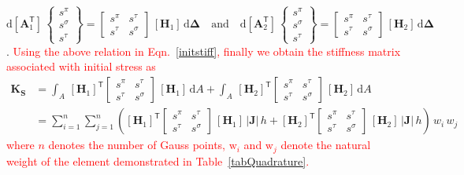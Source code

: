 \begin{equation}
\mathrm{d} [\mathbf{A}_1^{\mathsf{T}}] \, \begin{Bmatrix} s^{\pi} \\ s^{\sigma} \\  s^{\tau} \end{Bmatrix} = \begin{bmatrix}s^{\pi} & s^{\tau} \\ 
s^{\tau} & s^{\sigma} \end{bmatrix} \, [\mathbf{H}_1] \, \mathrm{d} \boldsymbol{\Delta} \quad \text{and} \quad \mathrm{d} [\mathbf{A}_2^{\mathsf{T}}] \, \begin{Bmatrix} s^{\pi} \\ s^{\sigma} \\  s^{\tau} \end{Bmatrix} = \begin{bmatrix} s^{\pi} & s^{\tau} \\ 
s^{\tau} & s^{\sigma} \end{bmatrix} \, [\mathbf{H}_2] \, \mathrm{d} \boldsymbol{\Delta}
\end{equation}.
\textcolor{red}{Using the above relation in Eqn.~\eqref{initstiff}, finally we obtain the stiffness matrix associated with initial stress as}
\begin{equation}
\begin{aligned}
\mathbf{K_{\mathbf{S}}} & =  \int_A \, [\mathbf{H}_1]^{\mathsf{T}}  \begin{bmatrix} s^{\pi} & s^{\tau} \\ 
s^{\tau} & s^{\sigma}
\end{bmatrix} \, [\mathbf{H}_1] \, \mathrm{d} A + \int_A \, [\mathbf{H}_2]^{\mathsf{T}}  \begin{bmatrix} s^{\pi} & s^{\tau} \\ 
s^{\tau} & s^{\sigma} 
\end{bmatrix} \, [\mathbf{H}_2] \, \mathrm{d} A\\
& =  \sum_{i=1}^{n} \sum_{j=1}^{n} \left( [\mathbf{H}_1]^{\mathsf{T}}  \begin{bmatrix} s^{\pi} & s^{\tau} \\ 
s^{\tau} & s^{\sigma}
\end{bmatrix} \, [\mathbf{H}_1] \, |\mathbf{J}| \, h  + [\mathbf{H}_2]^{\mathsf{T}}  \begin{bmatrix} s^{\pi} & s^{\tau} \\ 
s^{\tau} & s^{\sigma}
\end{bmatrix} \, [\mathbf{H}_2] \, |\mathbf{J}| \, h \right) \,  w_i \, w_j
\end{aligned}
\end{equation}
\textcolor{red}{where $n$ denotes the number of Gauss points, $\mathrm{w}_i$ and $\mathrm{w}_j$ denote the natural weight of the element demonstrated in Table~\ref{tabQuadrature}.}

